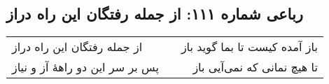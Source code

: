 \begin{center}
\section*{رباعی شماره ۱۱۱: از جمله رفتگان این راه دراز}
\label{sec:sh111}
\begin{longtable}{l p{0.5cm} r}
از جمله رفتگان این راه دراز
&&
باز آمده کیست تا بما گوید باز
\\
پس بر سر این دو راههٔ آز و نیاز
&&
تا هیچ نمانی که نمی‌آیی باز
\\
\end{longtable}
\end{center}
